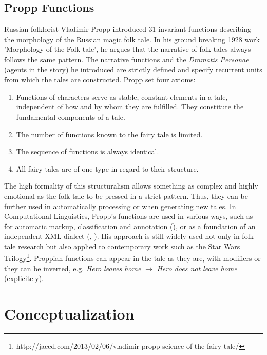 \documentclass[10pt,a4paper]{article}
\begin{document}
	\subsection{Propp Functions} 
	Russian folklorist Vladimir Propp introduced 31 invariant functions describing the morphology of the Russian magic folk tale. In his ground breaking 1928 work 'Morphology of the Folk tale', he argues that the narrative of folk tales always follows the same pattern. The narrative functions and the \textit{Dramatis Personae} (agents in the story) he introduced are strictly defined and specify recurrent units from which the tales are constructed. 
	Propp \cite{propp1968} set four axioms: 
	
	\begin{enumerate}
	
		\item Functions of characters serve as stable, constant elements in a tale, independent of how and by whom they are fulfilled. They constitute the fundamental components of a tale.
		\item The number of functions known to the fairy tale is limited.
		\item The sequence of functions is always identical.
		\item All fairy tales are of one type in regard to their structure.   
	
	\end{enumerate}
	
The high formality of this structuralism allows something as complex and highly emotional as the folk tale to be pressed in a strict pattern. Thus, they can be further used in automatically processing or when generating new tales. In Computational Linguistics, Propp's functions are used in various ways, such as for automatic markup, classification and annotation (\cite{Malec2010}), or as a foundation of an independent XML dialect (\cite{Malec2010}, \cite{Lendvai2010}). 
	His approach is still widely used not only in folk tale research but also applied to contemporary work such as the Star Wars Trilogy\footnote{http://jaced.com/2013/02/06/vladimir-propp-science-of-the-fairy-tale/}.  Proppian functions can appear in the tale as they are, with modifiers or they can be inverted, e.g. \textit{Hero leaves home} $\rightarrow$ \textit{Hero does not leave home} (explicitely).

\section{Conceptualization}
\end{document}
